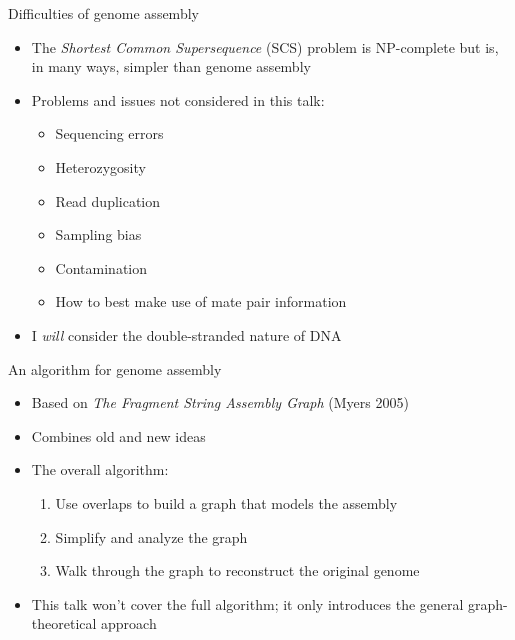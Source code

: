 \documentclass[xcolor=dvipsnames]{beamer}
\begin{document}
\begin{frame}{Difficulties of genome assembly}
    \begin{itemize}
        \item The {\em Shortest Common Supersequence} (SCS) problem is
            NP-complete but is, in many ways, simpler than genome assembly
        \item Problems and issues not considered in this talk:
            \begin{itemize}
                \item Sequencing errors
                \item Heterozygosity
                \item Read duplication
                \item Sampling bias
                \item Contamination
                \item How to best make use of mate pair information
            \end{itemize}
        \item I {\em will} consider the double-stranded nature of DNA
    \end{itemize}
\end{frame}

\begin{frame}{An algorithm for genome assembly}
    \begin{itemize}
        \item Based on {\it The Fragment String Assembly Graph} (Myers 2005)
        \item Combines old and new ideas
        \item The overall algorithm:
        \begin{enumerate}
            \item Use overlaps to build a graph that models the assembly
            \item Simplify and analyze the graph
            \item Walk through the graph to reconstruct the original genome
        \end{enumerate}
        \item This talk won't cover the full algorithm; it only introduces the
              general graph-theoretical approach
    \end{itemize}
\end{frame}
\end{document}
